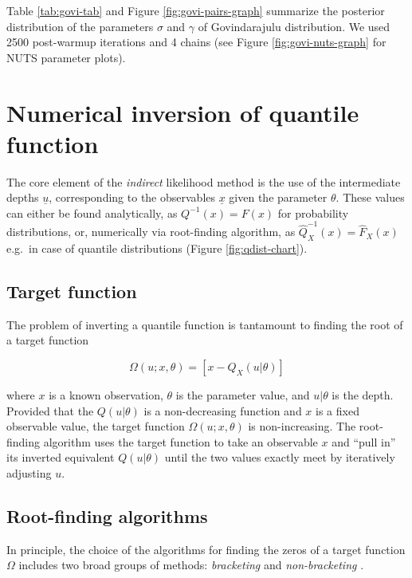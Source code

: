 \documentclass[ba]{imsart}
\numberwithin{equation}{section}
\theoremstyle{plain}
\begin{document}
Table \ref{tab:govi-tab} and Figure \ref{fig:govi-pairs-graph} summarize the posterior distribution of the parameters \(\sigma\) and \(\gamma\) of Govindarajulu distribution. We used 2500 post-warmup iterations and 4 chains (see Figure \ref{fig:govi-nuts-graph} for NUTS parameter plots).

\hypertarget{numerical-inversion-of-quantile-function}{%
\section{Numerical inversion of quantile function}\label{numerical-inversion-of-quantile-function}}

The core element of the \emph{indirect} likelihood method is the use of the intermediate depths \(\underline{u}\), corresponding to the observables \(\underline{x}\) given the parameter \(\theta\). These values can either be found analytically, as \(Q^{-1}(x)=F(x)\) for probability distributions, or, numerically via root-finding algorithm, as \(\widehat{Q}^{-1}_X(x)=\widehat{F}_X(x)\) e.g.~in case of quantile distributions (Figure \ref{fig:qdist-chart}).

\hypertarget{target-function}{%
\subsection{Target function}\label{target-function}}

The problem of inverting a quantile function is tantamount to finding the root of a target function

\[
 \Omega(u;x,\theta)=[x-Q_X(u|\theta)]
\]

where \(x\) is a known observation, \(\theta\) is the parameter value, and \(u|\theta\) is the depth. Provided that the \(Q(u|\theta)\) is a non-decreasing function and \(x\) is a fixed observable value, the target function \(\Omega(u;x,\theta)\) is non-increasing. The root-finding algorithm uses the target function to take an observable \(x\) and ``pull in'' its inverted equivalent \(Q(u|\theta)\) until the two values exactly meet by iteratively adjusting \(u\).

\hypertarget{root-finding-algorithms}{%
\subsection{Root-finding algorithms}\label{root-finding-algorithms}}

In principle, the choice of the algorithms for finding the zeros of a target function \(\Omega\) includes two broad groups of methods: \emph{bracketing} and \emph{non-bracketing} \citep{atkinson2008IntroductionNumericalAnalysis, burden2011NumericalAnalysis}.
\end{document}
